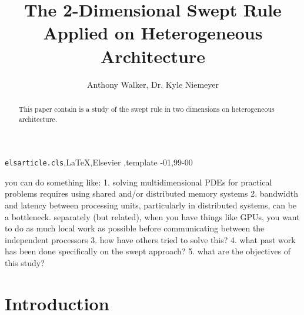 \documentclass[review]{elsarticle}
\begin{document}
\begin{frontmatter}

\title{The 2-Dimensional Swept Rule Applied on Heterogeneous Architecture}

\author{Anthony Walker, Dr. Kyle Niemeyer}


%

\begin{abstract}
This paper contain is a study of the swept rule in two dimensions on heterogeneous
architecture.
\end{abstract}

\begin{keyword}
\texttt{elsarticle.cls}\sep \LaTeX\sep Elsevier \sep template
-01\sep  99-00
\end{keyword}

\end{frontmatter}

\linenumbers

you can do something like:
1. solving multidimensional PDEs for practical problems requires using shared and/or distributed memory systems
2.  bandwidth and latency between processing units, particularly in distributed systems, can be a bottleneck. separately (but related), when you have things like GPUs, you want to do as much local work as possible before communicating between the independent processors
3. how have others tried to solve this?
4. what past work has been done specifically on the swept approach?
5. what are the objectives of this study?

\section{Introduction}
\end{document}

